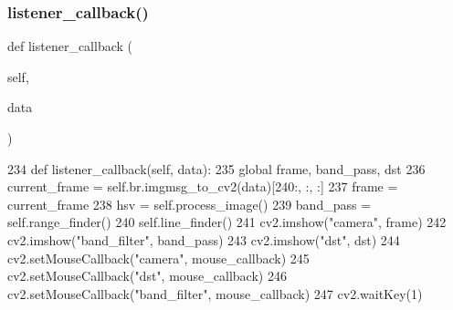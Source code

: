 \mbox{\label{classtoxic__vision_1_1lane__detector_1_1ImageSubscriber_a23dd9943cb7cb7be2a6e7022a85a1684}} 
\subsubsection{\texorpdfstring{listener\+\_\+callback()}{listener\_callback()}}
{\footnotesize\ttfamily def listener\+\_\+callback (\begin{DoxyParamCaption}\item[{}]{self,  }\item[{}]{data }\end{DoxyParamCaption})}


\begin{DoxyCode}
234   \textcolor{keyword}{def }listener\_callback(self, data):
235     \textcolor{keyword}{global} frame, band\_pass, dst
236     current\_frame = self.br.imgmsg\_to\_cv2(data)[240:, :, :]
237     frame = current\_frame
238     hsv = self.process\_image()
239     band\_pass = self.range\_finder()
240     self.line\_finder()
241     cv2.imshow(\textcolor{stringliteral}{"camera"}, frame)
242     cv2.imshow(\textcolor{stringliteral}{"band\_filter"}, band\_pass)
243     cv2.imshow(\textcolor{stringliteral}{"dst"}, dst)
244     cv2.setMouseCallback(\textcolor{stringliteral}{"camera"}, mouse\_callback)
245     cv2.setMouseCallback(\textcolor{stringliteral}{"dst"}, mouse\_callback)
246     cv2.setMouseCallback(\textcolor{stringliteral}{"band\_filter"}, mouse\_callback)
247     cv2.waitKey(1)
\end{DoxyCode}
\mbox{\label{classtoxic__vision_1_1lane__detector_1_1ImageSubscriber_a69f776519af775d0e6b8ef2bf9b2a37f}} 
